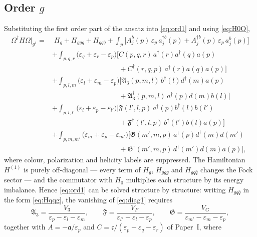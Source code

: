 \documentclass[11pt,a4paper]{article}
\numberwithin{equation}{section}
\newcommand{\mf}[1]{\mathfrak{#1}}
\newcommand{\eps}{\varepsilon}
\newcommand{\dg}{\dagger}
\newcommand{\OM}{\Omega}
\begin{document}
\subsection{Order $g$}

Substituting the first order part of the ansatz into \eqref{eq:ord1} and using \eqref{eq:H0O},
\begin{align}
\OM^{\dg}H\OM\Big|_{g^{1}}=&\;H_{g}+H_{ggg}+H_{gq\bar q}
+\int_{p}\Big[A^{b}_{j}(p)\,\eps_{p}\,a^{\dg b}_{j}(p)+A^{\dg b}_{j}(p)\,\eps_{p}\,a^{b}_{j}(p)\Big]
\nonumber\\
&+\int_{p,q,r}\big(\eps_{q}+\eps_{r}-\eps_{p}\big)\Big[C(p,q,r)\,a^{\dg}(r)a^{\dg}(q)a(p)
\nonumber\\&\hspace{4cm}+C^{\dg}(r,q,p)\,a^{\dg}(r)a(q)a(p)\Big]
\nonumber\\
&+\int_{p,l,m}\big(\eps_{l}+\eps_{m}-\eps_{p}\big)\Big[\mf A_{3}(p,m,l)\,b^{\dg}(l)d^{\dg}(m)a(p)
\nonumber\\&\hspace{4cm}+\mf A^{\dg}_{3}(p,m,l)\,a^{\dg}(p)d(m)b(l)\Big]
\nonumber\\
&+\int_{p,l,l'}\big(\eps_{l}+\eps_{p}-\eps_{l'}\big)\Big[\mf F(l',l,p)\,a^{\dg}(p)b^{\dg}(l)b(l')
\nonumber\\&\hspace{4cm}+\mf F^{\dg}(l',l,p)\,b^{\dg}(l')b(l)a(p)\Big]
\nonumber\\
&+\int_{p,m,m'}\big(\eps_{m}+\eps_{p}-\eps_{m'}\big)\Big[\mf G(m',m,p)\,a^{\dg}(p)d^{\dg}(m)d(m')
\nonumber\\&\hspace{4cm}+\mf G^{\dg}(m',m,p)\,d^{\dg}(m')d(m)a(p)\Big],
\label{eq:diag1}
\end{align}
where colour, polarization and helicity labels are suppressed. The Hamiltonian $H^{(1)}$ is purely
off-diagonal --- every term of $H_{g}$, $H_{ggg}$ and $H_{gq\bar q}$ changes the Fock sector --- and the
commutator with $H_{0}$ multiplies each structure by its energy imbalance. Hence \eqref{eq:ord1} can
be solved structure by structure: writing $H_{gq\bar q}$ in the form \eqref{eq:Hqqg}, the vanishing of
\eqref{eq:diag1} requires
\begin{equation}
\mf A_{3}=\frac{V_{3}}{\eps_{p}-\eps_{l}-\eps_{m}},\qquad
\mf F=\frac{V_{F}}{\eps_{l'}-\eps_{l}-\eps_{p}},\qquad
\mf G=\frac{V_{G}}{\eps_{m'}-\eps_{m}-\eps_{p}},
\label{eq:diagsol}
\end{equation}
together with $A=-\mf a/\eps_{p}$ and $C=\mf c/(\eps_{p}-\eps_{q}-\eps_{r})$ of Paper~I, where
\end{document}
